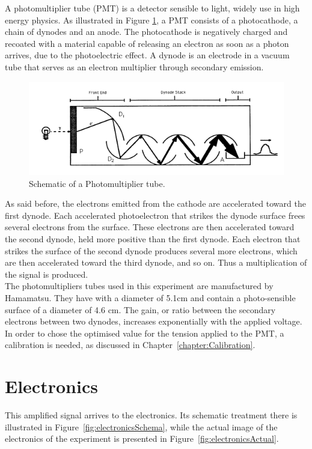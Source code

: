 \documentclass[10pt,swedish, openany]{book}
\begin{document}
A photomultiplier tube (PMT) is a detector sensible to light, widely use in high energy physics. As illustrated in Figure \ref{fig:PMT}, a PMT consists of a photocathode, a chain of dynodes and an anode. The photocathode is negatively charged and recoated with a material capable of releasing an electron as soon as a photon arrives, due to the photoelectric effect. A dynode is an electrode in a vacuum tube that serves as an electron multiplier through secondary emission.

\begin{figure}[H]
\includegraphics[scale=0.5]{PMT.png}
\centering
\caption{Schematic of a Photomultiplier tube.}
\label{fig:PMT}
\end{figure}

As said before, the electrons emitted from the cathode are accelerated toward the first dynode. Each accelerated photoelectron that strikes the dynode surface frees several electrons from the surface. These electrons are then accelerated toward the second dynode, held more positive than the first dynode. Each electron that strikes the surface of the second dynode produces several more electrons, which are then accelerated toward the third dynode, and so on. Thus a multiplication of the signal is produced.\\

The photomultipliers tubes used in this experiment are manufactured by Hamamatsu. They have with a diameter of 5.1cm and contain a photo-sensible surface of a diameter of 4.6 cm. The gain, or ratio between the secondary electrons between two dynodes, increases exponentially with the applied voltage.
In order to chose the optimised value for the tension applied to the PMT, a calibration is needed, as discussed in Chapter~\ref{chapter:Calibration}.

\section{Electronics}

This amplified signal arrives to the electronics. Its schematic treatment there is illustrated in Figure~\ref{fig:electronicsSchema}, while the actual image of the electronics of the experiment is presented in Figure~\ref{fig:electronicsActual}.
\end{document}
